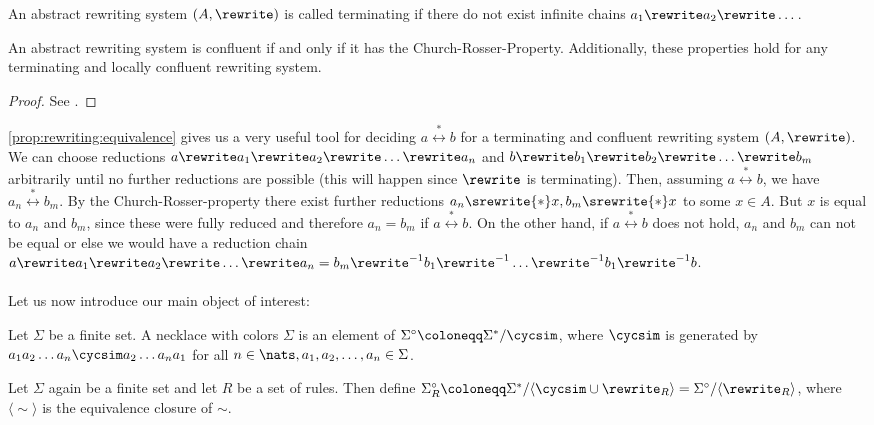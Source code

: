 \begin{definition}[Termination] An abstract rewriting system $(A, \rewrite)$ is called terminating if there do not exist infinite chains $a_1 \rewrite a_2 \rewrite \dots$.
\end{definition}

\begin{proposition} \label{prop:rewriting:equivalence} An abstract rewriting system is confluent if and only if it has the {\sc Church-Rosser}-Property. Additionally, these properties hold for any terminating and locally confluent rewriting system.
\begin{proof} See \cite{baader1999term}.
\end{proof}
\end{proposition}

\autoref{prop:rewriting:equivalence} gives us a very useful tool for deciding $a \stackrel{\ast}{\leftrightarrow} b$ for a terminating and confluent rewriting system $(A, \rewrite)$. We can choose reductions $a \rewrite a_1 \rewrite a_2 \rewrite \dots \rewrite a_n$ and $b \rewrite b_1 \rewrite b_2 \rewrite \dots \rewrite b_m$ arbitrarily until no further reductions are possible (this will happen since $\rewrite$ is terminating). Then, assuming $a \stackrel{\ast}{\leftrightarrow} b$, we have $a_n \stackrel{\ast}{\leftrightarrow} b_m$. By the {\sc Church-Rosser}-property there exist further reductions $a_n \srewrite{\ast} x, b_m \srewrite{\ast} x$ to some $x \in A$. But $x$ is equal to $a_n$ and $b_m$, since these were fully reduced and therefore $a_n = b_m$ if $a \stackrel{\ast}{\leftrightarrow} b$. On the other hand, if $a \stackrel{\ast}{\leftrightarrow} b$ does not hold, $a_n$ and $b_m$ can not be equal or else we would have a reduction chain $a \rewrite a_1 \rewrite a_2 \rewrite \dots \rewrite a_n = b_m \rewrite^{-1} b_1 \rewrite^{-1} \dots \rewrite^{-1} b_1 \rewrite^{-1} b$.
\\\\
Let us now introduce our main object of interest:

\begin{definition}[Necklace] \label{def:necklace} Let $\Sigma$ be a finite set. A necklace with colors $\Sigma$ is an element of $\Sigma^\circ \coloneqq \Sigma^\ast / \cycsim$, where $\cycsim$ is generated by $a_1 a_2 \dots a_n \cycsim a_2 \dots a_n a_1$ for all $n \in \nats, a_1, a_2, \dots, a_n \in \Sigma$.
\end{definition}

\begin{definition} Let $\Sigma$ again be a finite set and let $R$ be a set of rules. Then define $\Sigma_R^\circ \coloneqq \Sigma^\ast / \langle \cycsim \cup \rewrite_{R} \rangle = \Sigma^\circ /\langle \rewrite_R \rangle$, where $\langle \sim \rangle$ is the equivalence closure of $\sim$.
\end{definition}

